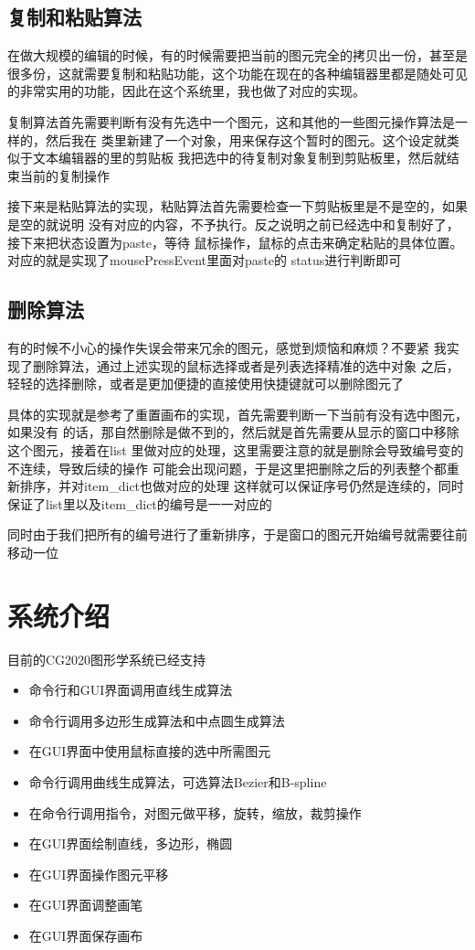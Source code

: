 \documentclass[a4paper,UTF8]{article}
\theoremstyle{definition}
\begin{document}
\subsection{复制和粘贴算法}
在做大规模的编辑的时候，有的时候需要把当前的图元完全的拷贝出一份，甚至是
很多份，这就需要复制和粘贴功能，这个功能在现在的各种编辑器里都是随处可见
的非常实用的功能，因此在这个系统里，我也做了对应的实现。

复制算法首先需要判断有没有先选中一个图元，这和其他的一些图元操作算法是一样的，然后我在
类里新建了一个对象，用来保存这个暂时的图元。这个设定就类似于文本编辑器的里的剪贴板
我把选中的待复制对象复制到剪贴板里，然后就结束当前的复制操作

接下来是粘贴算法的实现，粘贴算法首先需要检查一下剪贴板里是不是空的，如果是空的就说明
没有对应的内容，不予执行。反之说明之前已经选中和复制好了，接下来把状态设置为paste，等待
鼠标操作，鼠标的点击来确定粘贴的具体位置。对应的就是实现了mousePressEvent里面对paste的
status进行判断即可

\subsection{删除算法}
有的时候不小心的操作失误会带来冗余的图元，感觉到烦恼和麻烦？不要紧
我实现了删除算法，通过上述实现的鼠标选择或者是列表选择精准的选中对象
之后，轻轻的选择删除，或者是更加便捷的直接使用快捷键就可以删除图元了

具体的实现就是参考了重置画布的实现，首先需要判断一下当前有没有选中图元，如果没有
的话，那自然删除是做不到的，然后就是首先需要从显示的窗口中移除这个图元，接着在list
里做对应的处理，这里需要注意的就是删除会导致编号变的不连续，导致后续的操作
可能会出现问题，于是这里把删除之后的列表整个都重新排序，并对item\_dict也做对应的处理
这样就可以保证序号仍然是连续的，同时保证了list里以及item\_dict的编号是一一对应的

同时由于我们把所有的编号进行了重新排序，于是窗口的图元开始编号就需要往前移动一位



\section{系统介绍}
目前的CG2020图形学系统已经支持
\begin{itemize}
    \item 命令行和GUI界面调用直线生成算法
    \item 命令行调用多边形生成算法和中点圆生成算法
    \item 在GUI界面中使用鼠标直接的选中所需图元
    \item 命令行调用曲线生成算法，可选算法Bezier和B-spline
    \item 在命令行调用指令，对图元做平移，旋转，缩放，裁剪操作
    \item 在GUI界面绘制直线，多边形，椭圆
    \item 在GUI界面操作图元平移
    \item 在GUI界面调整画笔
    \item 在GUI界面保存画布
\end{itemize}
\end{document}
